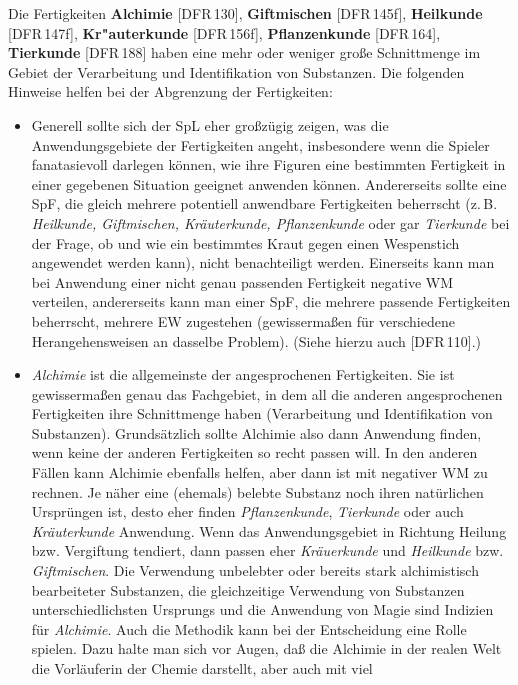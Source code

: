 \documentclass[10pt,a4paper,germanpar]{article}
\begin{document}
Die Fertigkeiten \textbf{Alchimie} [DFR\,130], \textbf{Giftmischen}
[DFR\,145f], \textbf{Heilkunde} [DFR\,147f], \textbf{Kr"auterkunde}
[DFR\,156f], \textbf{Pflanzenkunde} [DFR\,164], \textbf{Tierkunde}
[DFR\,188] haben eine mehr oder weniger große Schnittmenge im Gebiet
der Verarbeitung und Identifikation von Substanzen. Die folgenden
Hinweise helfen bei der Abgrenzung der Fertigkeiten:
\begin{itemize}
\item Generell sollte sich der SpL eher großzügig zeigen, was die
  Anwendungsgebiete der Fertigkeiten angeht, insbesondere wenn die Spieler
  fanatasievoll darlegen können, wie ihre Figuren eine bestimmten Fertigkeit
  in einer gegebenen Situation geeignet anwenden können. Andererseits sollte
  eine SpF, die gleich mehrere potentiell anwendbare Fertigkeiten beherrscht
  (z.\,B. \emph{Heilkunde, Giftmischen, Kräuterkunde, Pflanzenkunde} oder gar
  \emph{Tierkunde} bei der Frage, ob und wie ein bestimmtes Kraut gegen
  einen Wespenstich angewendet werden kann), nicht benachteiligt werden.
  Einerseits kann man bei Anwendung einer nicht genau passenden Fertigkeit
  negative WM verteilen, andererseits kann man einer SpF, die mehrere
  passende Fertigkeiten beherrscht, mehrere EW zugestehen (gewissermaßen für
  verschiedene Herangehensweisen an dasselbe Problem). (Siehe hierzu
  auch [DFR\,110].)
\item \emph{Alchimie} ist die allgemeinste der angesprochenen Fertigkeiten.
  Sie ist gewissermaßen genau das Fachgebiet, in dem all die anderen
  angesprochenen Fertigkeiten ihre Schnittmenge haben (Verarbeitung und
  Identifikation von Substanzen). Grundsätzlich sollte Alchimie also dann
  Anwendung finden, wenn keine der anderen Fertigkeiten so recht passen
  will. In den anderen Fällen kann Alchimie ebenfalls helfen, aber dann ist
  mit negativer WM zu rechnen. Je näher eine (ehemals) belebte Substanz noch
  ihren natürlichen Ursprüngen ist, desto eher finden \emph{Pflanzenkunde},
  \emph{Tierkunde} oder auch \emph{Kräuterkunde} Anwendung. Wenn das
  Anwendungsgebiet in Richtung Heilung bzw. Vergiftung tendiert, dann passen
  eher \emph{Kräuerkunde} und \emph{Heilkunde} bzw. \emph{Giftmischen}. Die
  Verwendung unbelebter oder bereits stark alchimistisch bearbeiteter
  Substanzen, die gleichzeitige Verwendung von Substanzen
  unterschiedlichsten Ursprungs und die Anwendung von Magie sind Indizien
  für \emph{Alchimie}. Auch die Methodik kann bei der Entscheidung eine
  Rolle spielen. Dazu halte man sich vor Augen, daß die Alchimie in der
  realen Welt die Vorläuferin der Chemie darstellt, aber auch mit viel

\end{itemize}
\end{document}
